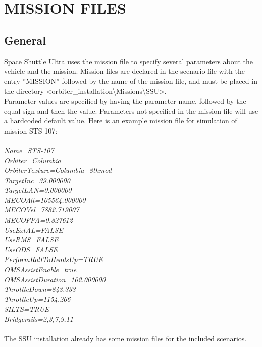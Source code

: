 \documentclass[Space_Shuttle_Ultra_Manual.tex]{subfiles}
\begin{document}
\section{MISSION FILES}
\begin{multicols*}{2}
\label{sec:mission-files}
\renewcommand{\cfttoctitlefont}{\bf}
\localtableofcontents
\end{multicols*}

\subsection{General}
\begin{multicols*}{2}
\noindent
Space Shuttle Ultra uses the mission file to specify several parameters about the vehicle and the mission. Mission files are declared in the scenario file with the entry ''MISSION'' followed by the name of the mission file, and must be placed in the directory <orbiter\_installation\textbackslash Missions\textbackslash SSU>.
\\
Parameter values are specified by having the parameter name, followed by the equal sign and then the value. Parameters not specified in the mission file will use a hardcoded default value. Here is an example mission file for simulation of mission STS-107$\colon$
\\
\\
\textit{Name=STS-107}
\\
\textit{Orbiter=Columbia}
\\
\textit{OrbiterTexture=Columbia\_8thmod}
\\
\textit{TargetInc=39.000000}
\\
\textit{TargetLAN=0.000000}
\\
\textit{MECOAlt=105564.000000}
\\
\textit{MECOVel=7882.719007}
\\
\textit{MECOFPA=0.827612}
\\
\textit{UseExtAL=FALSE}
\\
\textit{UseRMS=FALSE}
\\
\textit{UseODS=FALSE}
\\
\textit{PerformRollToHeadsUp=TRUE}
\\
\textit{OMSAssistEnable=true}
\\
\textit{OMSAssistDuration=102.000000}
\\
\textit{ThrottleDown=843.333}
\\
\textit{ThrottleUp=1154.266}
\\
\textit{SILTS=TRUE}
\\
\textit{Bridgerails=2,3,7,9,11}
\\
\\
The SSU installation already has some mission files for the included scenarios.

\end{multicols*}
\end{document}
